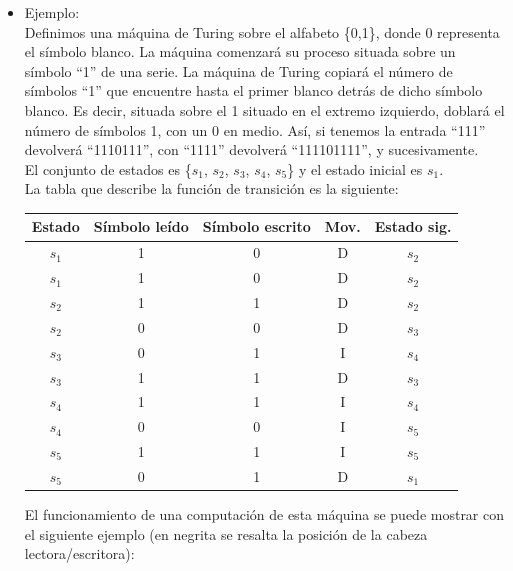 \documentclass[12pt,a4paper,spanish]{book}
\begin{document}
\begin{itemize}
\begin{itemize}
\end{itemize}
Existen en la literatura un abundante n\'umero de definiciones alternativas, pero todas ellas tienen el mismo poder computacional, por ejemplo se puede a\~nadir el s\'imbolo S como s\'imbolo de ``no movimiento'' en un paso de c\'omputo o el s\'imbolo $\Sigma$ para indicar el alfabeto de entrada.
\newpage
\item Ejemplo:\\
\newline
Definimos una m\'aquina de Turing sobre el alfabeto \{0,1\}, donde 0 representa el s\'imbolo blanco. La m\'aquina comenzar\'a su proceso situada sobre un s\'imbolo ``1'' de una serie. La m\'aquina de Turing copiar\'a el n\'umero de s\'imbolos ``1'' que encuentre hasta el primer blanco detr\'as de dicho s\'imbolo blanco. Es decir, situada sobre el 1 situado en el extremo izquierdo, doblar\'a el n\'umero de s\'imbolos 1, con un 0 en medio. As\'i, si tenemos la entrada ``111'' devolver\'a ``1110111'', con ``1111'' devolver\'a ``111101111'', y sucesivamente.\\
El conjunto de estados es \{$s_1$, $s_2$, $s_3$, $s_4$, $s_5$\} y el estado inicial es $s_1$.\\
\newline
La tabla que describe la funci\'on de transici\'on es la siguiente:\\
\begin{center}
\begin{tabular}{||c|c|c|c|c||}
\hline
Estado & S\'imbolo le\'ido & S\'imbolo escrito & Mov. & Estado sig. \\
\hline
$s_{1}$ & 1 & 0 & D & $s_{2}$ \\
\hline
$s_{1}$ & 1 & 0 & D & $s_{2}$ \\
\hline
$s_{2}$ & 1 & 1 & D & $s_{2}$ \\
\hline
$s_{2}$ & 0 & 0 & D & $s_{3}$ \\
\hline
$s_{3}$ & 0 & 1 & I & $s_{4}$ \\
\hline
$s_{3}$ & 1 & 1 & D & $s_{3}$ \\
\hline
$s_{4}$ & 1 & 1 & I & $s_{4}$ \\
\hline
$s_{4}$ & 0 & 0 & I & $s_{5}$ \\
\hline
$s_{5}$ & 1 & 1 & I & $s_{5}$ \\
\hline
$s_{5}$ & 0 & 1 & D & $s_{1}$ \\
\hline
\end{tabular}
\end{center}
\newpage
El funcionamiento de una computaci\'on de esta m\'aquina se puede mostrar con el siguiente ejemplo (en negrita se resalta la posici\'on de la cabeza lectora/escritora):\\

\end{itemize}
\end{document}
